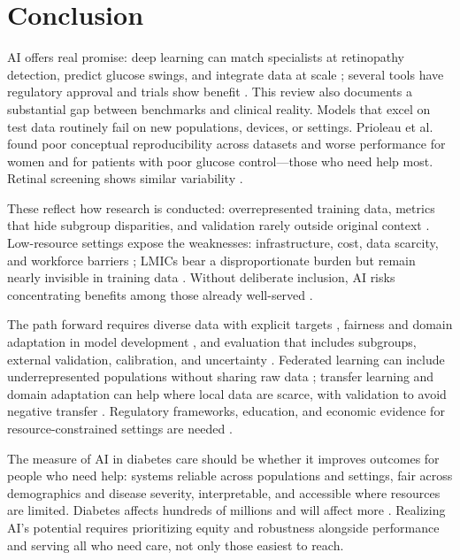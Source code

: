 \section{Conclusion}

AI offers real promise: deep learning can match specialists at retinopathy detection, predict glucose swings, and integrate data at scale \cite{zhang2025systematic, sun2021dualpathway, lee2024multimodal}; several tools have regulatory approval and trials show benefit \cite{wolf2024access, boucher2024implementation}. This review also documents a substantial gap between benchmarks and clinical reality. Models that excel on test data routinely fail on new populations, devices, or settings. Prioleau et al. \cite{prioleau2025deep} found poor conceptual reproducibility across datasets and worse performance for women and for patients with poor glucose control—those who need help most. Retinal screening shows similar variability \cite{zhang2025systematic, olusanya2024mitigating}.

These reflect how research is conducted: overrepresented training data, metrics that hide subgroup disparities, and validation rarely outside original context \cite{wang2024ai, prioleau2025deep}. Low-resource settings expose the weaknesses: infrastructure, cost, data scarcity, and workforce barriers \cite{desai2025barriers, eze2022sustainability, ghosh2025artificial}; LMICs bear a disproportionate burden but remain nearly invisible in training data \cite{sun2022idf, olusanya2024mitigating, raj2024federated}. Without deliberate inclusion, AI risks concentrating benefits among those already well-served \cite{haider2024algorithmic, wang2024ai}.

The path forward requires diverse data with explicit targets \cite{bai2024federated, fahmy2025exploring}, fairness and domain adaptation in model development \cite{fahmy2025exploring, chen2024crossmodality}, and evaluation that includes subgroups, external validation, calibration, and uncertainty \cite{prioleau2025deep, jacobs2023artificial, liu2025scoping}. Federated learning can include underrepresented populations without sharing raw data \cite{bai2024federated, raj2024federated}; transfer learning and domain adaptation can help where local data are scarce, with validation to avoid negative transfer \cite{chen2024crossmodality, zhou2023population}. Regulatory frameworks, education, and economic evidence for resource-constrained settings are needed \cite{mackenzie2023diabetes, khalifa2024artificial, bahmani2025achieving, guan2023artificial, ghosh2025artificial}.

The measure of AI in diabetes care should be whether it improves outcomes for people who need help: systems reliable across populations and settings, fair across demographics and disease severity, interpretable, and accessible where resources are limited. Diabetes affects hundreds of millions and will affect more \cite{sun2022idf}. Realizing AI's potential requires prioritizing equity and robustness alongside performance and serving all who need care, not only those easiest to reach.
